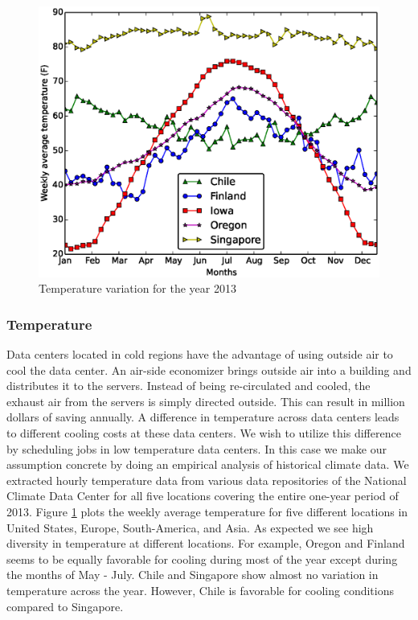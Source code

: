 \documentclass[conference,12pt]{IEEEtran}
\begin{document}
\begin{figure}[H]
\includegraphics[scale=0.45]{temperature}
\caption{ Temperature variation for the year 2013}
 \label{fig:temp}
\end{figure}





\subsubsection{Temperature} \label{sec:temp}
Data centers located in cold regions have the advantage of using outside air to cool the data center. An air-side economizer brings outside air into a building and distributes it to the servers. Instead of being re-circulated and cooled, the exhaust air from the servers is simply directed outside. This can result in million dollars of saving annually. A difference in temperature across data centers leads to different cooling costs at these data centers. We wish to utilize this difference by scheduling jobs in low temperature data centers. In this case we make our assumption concrete by doing an empirical analysis of historical climate data. We extracted hourly temperature data from various data repositories of the National Climate Data Center \cite{climatedata} for all five locations covering the entire one-year period of 2013. Figure \ref{fig:temp} plots the weekly average temperature for five different locations in United States, Europe, South-America, and Asia. As expected we see high diversity in temperature at different locations. For example, Oregon and Finland seems to be equally favorable for cooling during most of the year except during the months of May {-} July. Chile and Singapore show almost no variation in temperature across the year. However, Chile is favorable for cooling conditions compared to Singapore.
\end{document}
